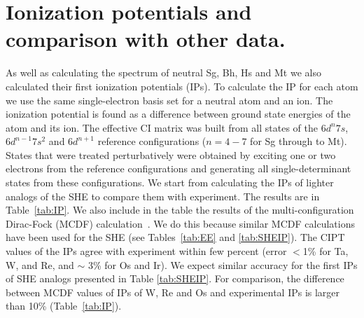 \documentclass[10pt,a4paper, twoside]{report}
\begin{document}
\section{Ionization potentials and comparison with other data.} \label{sec:SHEIP}

As well as calculating the spectrum of neutral Sg, Bh, Hs and Mt we also calculated their first ionization potentials (IPs). To calculate the IP for each atom we use the same single-electron basis set for a neutral atom and an ion. The ionization potential is found as a difference between ground state energies of the atom and its ion. The effective CI matrix was built from all states of the $6d^n 7s$, $6d^{n-1}7s^2$ and $6d^{n+1}$ reference configurations ($n=4-7$ for Sg through to Mt). States that were treated perturbatively were obtained by exciting one or two electrons from the reference configurations and generating all single-determinant states from these configurations. We start from calculating the IPs of lighter analogs of the SHE to compare them with experiment. The results are in Table~\ref{tab:IP}. We also include in the table the results of the multi-configuration Dirac-Fock (MCDF) calculation~\cite{MCDF-Sg,MCDF-BhHs}. We do this because similar MCDF calculations have been used for the SHE (see Tables~\ref{tab:EE} and \ref{tab:SHEIP}). The CIPT values of the IPs agree with experiment within few percent (error $<$1\% for Ta, W, and Re, and $\sim$ 3\% for Os and Ir). We expect similar accuracy for the first IPs of SHE analogs presented in Table \ref{tab:SHEIP}.  For comparison, the difference between MCDF values of IPs of W, Re and Os and experimental IPs is larger than 10\% (Table~\ref{tab:IP}).

\end{document}
